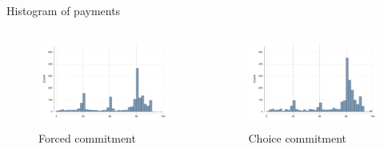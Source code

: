 \documentclass[8pt]{beamer}
\begin{document}
\begin{frame}{Histogram of payments}
\begin{columns}
\begin{column}{.33\textwidth}
    \begin{figure}[H]
    \caption{Forced commitment}
    \begin{center}
        \includegraphics[width=\textwidth]{Figuras/hist_payments_fc.pdf}
    \end{center}
\end{figure}
\end{column}

\begin{column}{.33\textwidth}
    \begin{figure}[H]
    \caption{Choice commitment}
    \begin{center}
        \includegraphics[width=\textwidth]{Figuras/hist_payments_cc.pdf}
    \end{center}
\end{figure}
\end{column}
\end{columns}


    
    \hyperlink{treatment_arms}{}
\end{frame}
\end{document}
